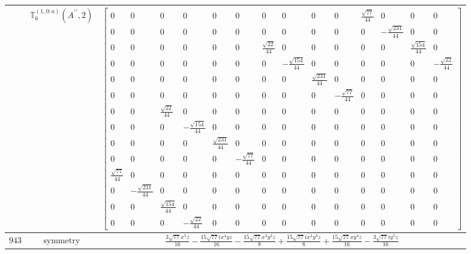\documentclass[fleqn,8pt,landscape]{jsarticle}
\begin{document}
\begin{longtable}{ccc}
$  $ & $ \mathbb{T}_{6}^{(1,0;a)}(A^{\prime\prime},2) $ & $ \begin{bmatrix} 0 & 0 & 0 & 0 & 0 & 0 & 0 & 0 & 0 & 0 & \frac{\sqrt{77}}{44} & 0 & 0 & 0 \\ 0 & 0 & 0 & 0 & 0 & 0 & 0 & 0 & 0 & 0 & 0 & - \frac{\sqrt{231}}{44} & 0 & 0 \\ 0 & 0 & 0 & 0 & 0 & 0 & \frac{\sqrt{22}}{44} & 0 & 0 & 0 & 0 & 0 & \frac{\sqrt{154}}{44} & 0 \\ 0 & 0 & 0 & 0 & 0 & 0 & 0 & - \frac{\sqrt{154}}{44} & 0 & 0 & 0 & 0 & 0 & - \frac{\sqrt{22}}{44} \\ 0 & 0 & 0 & 0 & 0 & 0 & 0 & 0 & \frac{\sqrt{231}}{44} & 0 & 0 & 0 & 0 & 0 \\ 0 & 0 & 0 & 0 & 0 & 0 & 0 & 0 & 0 & - \frac{\sqrt{77}}{44} & 0 & 0 & 0 & 0 \\ 0 & 0 & \frac{\sqrt{22}}{44} & 0 & 0 & 0 & 0 & 0 & 0 & 0 & 0 & 0 & 0 & 0 \\ 0 & 0 & 0 & - \frac{\sqrt{154}}{44} & 0 & 0 & 0 & 0 & 0 & 0 & 0 & 0 & 0 & 0 \\ 0 & 0 & 0 & 0 & \frac{\sqrt{231}}{44} & 0 & 0 & 0 & 0 & 0 & 0 & 0 & 0 & 0 \\ 0 & 0 & 0 & 0 & 0 & - \frac{\sqrt{77}}{44} & 0 & 0 & 0 & 0 & 0 & 0 & 0 & 0 \\ \frac{\sqrt{77}}{44} & 0 & 0 & 0 & 0 & 0 & 0 & 0 & 0 & 0 & 0 & 0 & 0 & 0 \\ 0 & - \frac{\sqrt{231}}{44} & 0 & 0 & 0 & 0 & 0 & 0 & 0 & 0 & 0 & 0 & 0 & 0 \\ 0 & 0 & \frac{\sqrt{154}}{44} & 0 & 0 & 0 & 0 & 0 & 0 & 0 & 0 & 0 & 0 & 0 \\ 0 & 0 & 0 & - \frac{\sqrt{22}}{44} & 0 & 0 & 0 & 0 & 0 & 0 & 0 & 0 & 0 & 0 \end{bmatrix} $ \\ \hline
$ 943 $ & $ \text{symmetry} $ & $ \frac{3 \sqrt{77} x^{5} z}{16} - \frac{15 \sqrt{77} i x^{4} y z}{16} - \frac{15 \sqrt{77} x^{3} y^{2} z}{8} + \frac{15 \sqrt{77} i x^{2} y^{3} z}{8} + \frac{15 \sqrt{77} x y^{4} z}{16} - \frac{3 \sqrt{77} i y^{5} z}{16} $ \\

\end{longtable}
\end{document}
